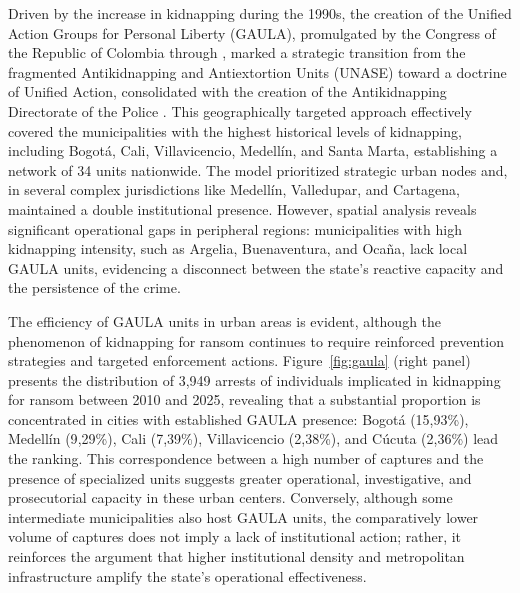 \documentclass[ecta,nameyear,draft]{econsocart}
\theoremstyle{plain}
\theoremstyle{definition}
\newcommand{\1}{\mathbf{1}}
\begin{document}
Driven by the increase in kidnapping during the 1990s, the creation of the Unified Action Groups for Personal Liberty (GAULA), promulgated by the Congress of the Republic of Colombia through \citet{ley282_1996}, marked a strategic transition from the fragmented Antikidnapping and Antiextortion Units (UNASE) toward a doctrine of Unified Action, consolidated with the creation of the Antikidnapping Directorate of the Police \citet{decreto864_1998}. This geographically targeted approach effectively covered the municipalities with the highest historical levels of kidnapping, including Bogotá, Cali, Villavicencio, Medellín, and Santa Marta, establishing a network of 34 units nationwide. The model prioritized strategic urban nodes and, in several complex jurisdictions like Medellín, Valledupar, and Cartagena, maintained a double institutional presence. However, spatial analysis reveals significant operational gaps in peripheral regions: municipalities with high kidnapping intensity, such as Argelia, Buenaventura, and Ocaña, lack local GAULA units, evidencing a disconnect between the state's reactive capacity and the persistence of the crime.

The efficiency of GAULA units in urban areas is evident, although the phenomenon of kidnapping for ransom continues to require reinforced prevention strategies and targeted enforcement actions. Figure~\ref{fig:gaula} (right panel) presents the distribution of 3,949 arrests of individuals implicated in kidnapping for ransom between 2010 and 2025, revealing that a substantial proportion is concentrated in cities with established GAULA presence: Bogotá (15{,}93\%), Medellín (9{,}29\%), Cali (7{,}39\%), Villavicencio (2{,}38\%), and Cúcuta (2{,}36\%) lead the ranking. This correspondence between a high number of captures and the presence of specialized units suggests greater operational, investigative, and prosecutorial capacity in these urban centers. Conversely, although some intermediate municipalities also host GAULA units, the comparatively lower volume of captures does not imply a lack of institutional action; rather, it reinforces the argument that higher institutional density and metropolitan infrastructure amplify the state's operational effectiveness.
\end{document}
